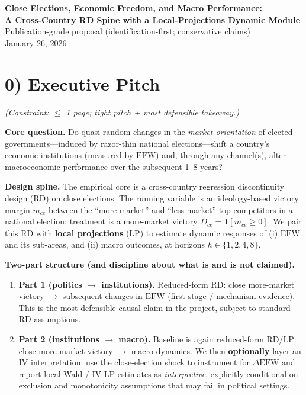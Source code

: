 \documentclass[11pt]{article}
\newcommand{\EFW}{\mathrm{EFW}}
\newcommand{\IV}{\mathrm{IV}}
\newcommand{\1}{\mathbf{1}}
\newcommand{\cid}{c}
\newcommand{\eid}{e}
\begin{document}
\begin{center}
{\LARGE \textbf{Close Elections, Economic Freedom, and Macro Performance:}}\\
{\LARGE \textbf{A Cross-Country RD Spine with a Local-Projections Dynamic Module}}\\
\vspace{0.3em}
{\large Publication-grade proposal (identification-first; conservative claims)}\\
\vspace{0.3em}
{\large January 26, 2026}
\end{center}

\vspace{0.8em}

\section*{0) Executive Pitch}
\textit{(Constraint: $\leq$ 1 page; tight pitch + most defensible takeaway.)}

\textbf{Core question.} Do quasi-random changes in the \emph{market orientation} of elected governments---induced by razor-thin national elections---shift a country's economic institutions (measured by $\EFW$) and, through any channel(s), alter macroeconomic performance over the subsequent 1--8 years?

\textbf{Design spine.} The empirical core is a cross-country regression discontinuity design (RD) on close elections. The running variable is an ideology-based victory margin $m_{\cid \eid}$ between the ``more-market'' and ``less-market'' top competitors in a national election; treatment is a more-market victory $D_{\cid \eid}=\1[m_{\cid \eid}\ge 0]$. We pair this RD with \textbf{local projections} (LP) to estimate dynamic responses of (i) $\EFW$ and its sub-areas, and (ii) macro outcomes, at horizons $h\in\{1,2,4,8\}$.

\textbf{Two-part structure (and discipline about what is and is not claimed).}
\begin{enumerate}[leftmargin=1.2em]
\item \textbf{Part 1 (politics $\rightarrow$ institutions).} Reduced-form RD: close more-market victory $\rightarrow$ subsequent changes in $\EFW$ (first-stage / mechanism evidence). This is the most defensible causal claim in the project, subject to standard RD assumptions.
\item \textbf{Part 2 (institutions $\rightarrow$ macro).} Baseline is again reduced-form RD/LP: close more-market victory $\rightarrow$ macro dynamics. We then \textbf{optionally} layer an $\IV$ interpretation: use the close-election shock to instrument for $\Delta \EFW$ and report local-Wald / $\IV$-LP estimates as \emph{interpretive}, explicitly conditional on exclusion and monotonicity assumptions that may fail in political settings.
\end{enumerate}
\end{document}
